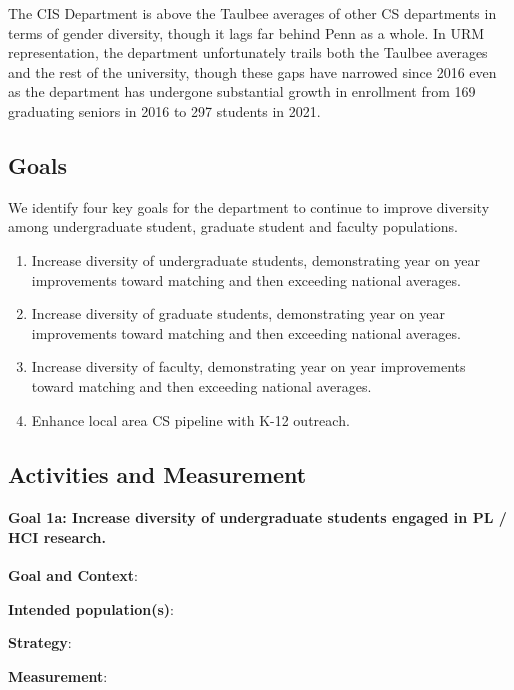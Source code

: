 The CIS Department is above the Taulbee averages of other CS departments in terms of gender diversity, though it lags far behind Penn as a whole. In URM representation, the department unfortunately trails both the Taulbee averages and the rest of the university, though these gaps have narrowed since 2016 even as the department has undergone substantial growth in enrollment from 169 graduating seniors in 2016 to 297 students in 2021.

\subsection*{Goals}

We identify four key goals for the department to continue to improve diversity among undergraduate student, graduate student and faculty populations.
\begin{enumerate}
\item
Increase diversity of undergraduate students, demonstrating year on year improvements toward matching and then exceeding national averages.
\item
Increase diversity of graduate students, demonstrating year on year improvements toward matching and then exceeding national averages.
\item
Increase diversity of faculty, demonstrating year on year improvements toward matching and then exceeding national averages.
\item
Enhance local area CS pipeline with K-12 outreach.
\end{enumerate}

\subsection*{Activities and Measurement}


\paragraph*{Goal 1a: Increase diversity of undergraduate students engaged in PL
/ HCI research.}

\textbf{Goal and Context}:

\textbf{Intended population(s)}:

\textbf{Strategy}:

\textbf{Measurement}:

